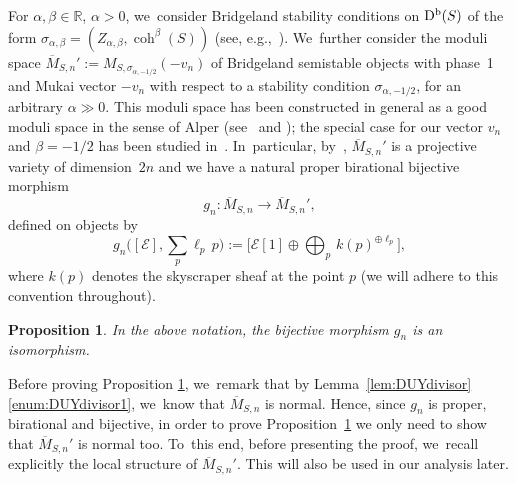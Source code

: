 \documentclass[11pt]{article}
\newcommand{\RR}{{\mathbb R}}
\newcommand\cE{\mathcal{E}}
\DeclareMathOperator{\coh}{coh}
\DeclareMathOperator{\Db}{D^{\textup b}}
\newtheorem{prop}[lemm]{Proposition}
\theoremstyle{definition}
\begin{document}
For $\alpha,\beta\in\RR$, $\alpha>0$, we~consider Bridgeland stability conditions on $\Db(S)$ of the form $\sigma_{\alpha,\beta}=(Z_{\alpha,\beta},\coh^\beta(S))$ (see, e.g.,~\cite[Ex.\,3.7]{involutions1}). We~further consider the moduli space $\overline{M}{}_{S,n}':=M_{S,\sigma_{\alpha,-1/2}}(-v_n)$ of Bridgeland semistable objects with phase~1 and Mukai vector $-v_n$ with respect to a stability condition $\sigma_{\alpha,-1/2}$, for an arbitrary $\alpha\gg 0$.
This moduli space has been constructed in general as a good moduli space in the sense of Alper (see~\cite{Alper:GoodModuli,AHLH:Moduli} and \cite[Th.\,21.24]{BLMNPS:family}); the special case for our vector $v_n$ and $\beta=-1/2$ has been studied in~\cite{Tajakka:Uhlenbeck}. In~particular, by~\cite[Th.\,1.1]{Tajakka:Uhlenbeck}, $\overline{M}{}_{S,n}'$ is a projective variety of dimension~$2n$ and we have a natural proper birational bijective morphism
\[
g_n\colon \overline{M}_{S,n} \to \overline{M}{}_{S,n}',
\]
defined on objects by
\begin{equation}\label{eq:GiesekerToDUY}\textstyle
g_n\bigl([\cE],\sum_p \ell_p\, p\bigr):=\bigl[\cE[1]\oplus \bigoplus_p\, k(p)^{\oplus \ell_p}\bigr],
\end{equation}
where $k(p)$ denotes the skyscraper sheaf at the point $p$ (we will adhere to this convention throughout).

\begin{prop}\label{prop:UhlenbeckVsBridgeland}
In the above notation, the bijective morphism $g_n$ is an isomorphism.
\end{prop}

Before proving Proposition \ref{prop:UhlenbeckVsBridgeland}, we~remark that by Lemma~\ref{lem:DUYdivisor}\ref{enum:DUYdivisor1}, we~know that $\overline{M}_{S,n}$ is normal.
Hence, since $g_n$ is proper, birational and bijective, in order to prove Proposition~\ref{prop:UhlenbeckVsBridgeland} we only need to show that $\overline{M}{}_{S,n}'$ is normal too. To~this end, before presenting the proof, we~recall explicitly the local structure of $\overline{M}{}_{S,n}'$. This will also be used in our analysis later.
\end{document}
